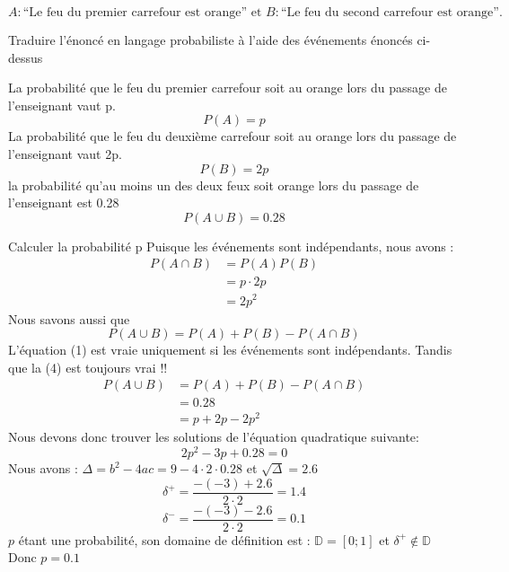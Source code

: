 \begin{exo}
  $$A : \text{“Le feu du premier carrefour est orange” et } B : \text{“Le feu du second carrefour est orange”.}$$
  \begin{subexo}{Traduire l'énoncé en langage probabiliste à l'aide des événements énoncés ci-dessus}

    La probabilité que le feu du premier carrefour soit au orange lors du passage de l'enseignant vaut p.
    $$P(A) = p$$
    La probabilité que le feu du deuxième carrefour soit au orange lors du passage de l'enseignant vaut 2p.
    $$P(B) = 2p$$
    la
    probabilité qu’au moins un des deux feux soit orange lors du passage de l’enseignant est 0.28
    $$P(A\cup B) = 0.28$$

  \end{subexo}
  \begin{subexo}{Calculer la probabilité p}
    Puisque les événements sont indépendants, nous avons :
        \begin{align}
          P(A \cap B) &= P(A) P(B)\\
      &= p \cdot 2p\\
      &= 2p^2
        \end{align}
      Nous savons aussi que
        \begin{equation}
          P(A \cup B) = P(A) + P(B) -P(A \cap B)
        \end{equation}
        L'équation (1) est vraie uniquement si les événements sont indépendants. Tandis que la (4) est toujours vrai !!
        \begin{align}
          P(A \cup B) &= P(A) + P(B) -P(A \cap B)\\
           &= 0.28\\
           &= p + 2p - 2p^2
        \end{align}
        Nous devons donc trouver les solutions de l'équation quadratique suivante:
        $$2p^2 - 3p + 0.28 = 0$$
          Nous avons : $\Delta = b^2 -4ac = 9 -4\cdot 2\cdot 0.28$\newline
           et $\sqrt{\Delta} = 2.6$
           $$\delta^+ = \frac{-(-3) + 2.6}{2\cdot2} = 1.4$$
           $$\delta^- = \frac{-(-3) - 2.6}{2\cdot2} = 0.1$$
          $p$ étant une probabilité, son domaine de définition est : $\mathbb{D} = [0;1]$ et $\delta^+ \notin \mathbb{D}$
          Donc $p = 0.1$
  \end{subexo}
\end{exo}
